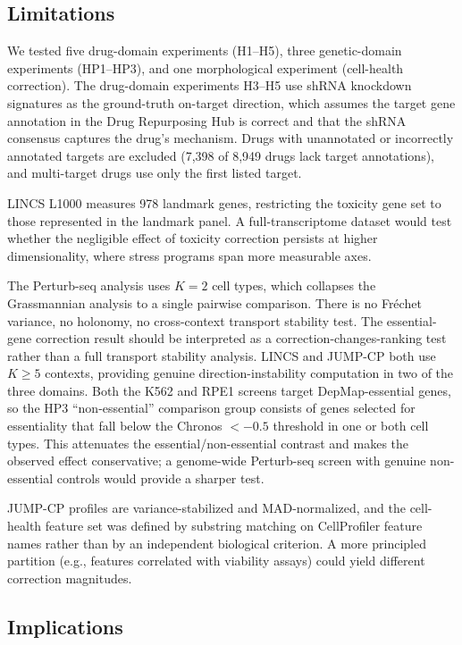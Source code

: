 \documentclass{article}
\begin{document}
\subsection{Limitations}

We tested five drug-domain experiments (H1--H5), three genetic-domain
experiments (HP1--HP3), and one morphological experiment (cell-health
correction). The drug-domain experiments H3--H5 use shRNA knockdown
signatures as the ground-truth on-target direction, which assumes the
target gene annotation in the Drug Repurposing Hub is correct and that
the shRNA consensus captures the drug's mechanism. Drugs with
unannotated or incorrectly annotated targets are excluded (7{,}398 of
8{,}949 drugs lack target annotations), and multi-target drugs use only
the first listed target.

LINCS L1000 measures 978 landmark genes, restricting the toxicity gene set to
those represented in the landmark panel. A full-transcriptome dataset would
test whether the negligible effect of toxicity correction persists at higher
dimensionality, where stress programs span more measurable axes.

The Perturb-seq analysis uses $K = 2$ cell types, which collapses the
Grassmannian analysis to a single pairwise comparison. There is no Fr\'echet
variance, no holonomy, no cross-context transport stability test. The
essential-gene correction result should be interpreted as a
correction-changes-ranking test rather than a full transport stability
analysis. LINCS and JUMP-CP both use $K \geq 5$ contexts, providing
genuine direction-instability computation in two of the three domains.
Both the K562 and RPE1 screens target DepMap-essential genes, so the
HP3 ``non-essential'' comparison group consists of genes selected for
essentiality that fall below the Chronos $< -0.5$ threshold in one or
both cell types. This attenuates the essential/non-essential contrast and
makes the observed effect conservative; a genome-wide Perturb-seq screen
with genuine non-essential controls would provide a sharper test.

JUMP-CP profiles are variance-stabilized and MAD-normalized, and the
cell-health feature set was defined by substring matching on CellProfiler
feature names rather than by an independent biological criterion. A more
principled partition (e.g., features correlated with viability assays)
could yield different correction magnitudes.

\subsection{Implications}
\end{document}
